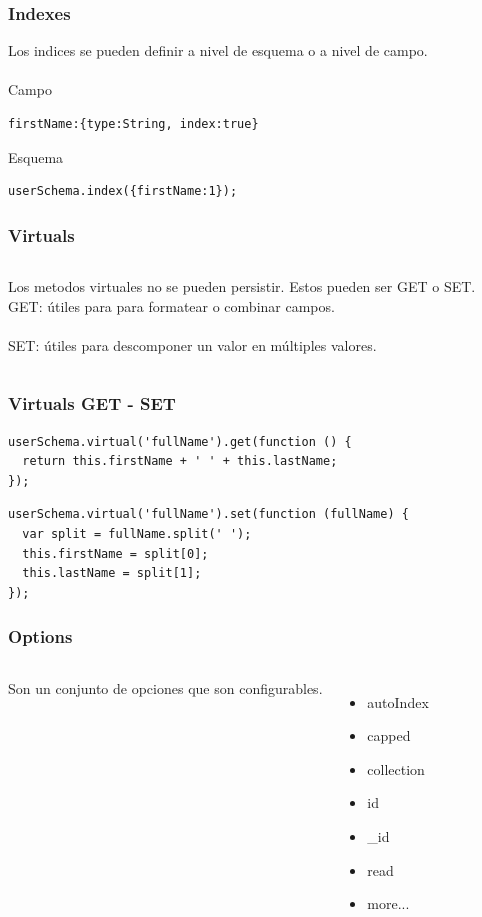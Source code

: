 \documentclass{beamer}
\begin{document}
\begin{frame}[fragile]
\frametitle{Indexes}
Los indices se pueden definir a nivel de esquema o a nivel de campo.
\\~\\
Campo
\begin{lstlisting}
firstName:{type:String, index:true}
\end{lstlisting}
Esquema
\begin{lstlisting}
userSchema.index({firstName:1});
\end{lstlisting}
\end{frame}

\begin{frame}
\frametitle{Virtuals}
\begin{columns}[c]
Los metodos virtuales no se pueden persistir. Estos pueden ser GET o SET.
GET: \'utiles para para formatear o combinar campos.
\\~\\
SET: \'utiles para descomponer un valor en m\'ultiples valores. 
\end{columns}
\end{frame}

\begin{frame}[fragile]
\frametitle{Virtuals GET - SET}
\medskip
\begin{lstlisting}
userSchema.virtual('fullName').get(function () {
  return this.firstName + ' ' + this.lastName;
});
\end{lstlisting}

\begin{lstlisting}
userSchema.virtual('fullName').set(function (fullName) {
  var split = fullName.split(' ');
  this.firstName = split[0];
  this.lastName = split[1];
});
\end{lstlisting}
\end{frame}

\begin{frame}
\frametitle{Options}
\begin{columns}[c]
Son un conjunto de opciones que son configurables.
\begin{itemize}[<+->]
\item autoIndex
\item capped
\item collection
\item id
\item \_id
\item read
\item more...
\end{itemize}
\end{columns}
\end{frame}
\end{document}
